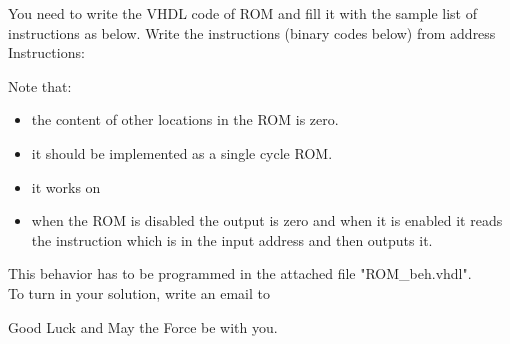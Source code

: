 \documentclass[a4paper,12pt]{article}
\begin{document}
You need to write the VHDL code of ROM and fill it with the sample list of instructions as below. Write the instructions (binary codes below) from address %
Instructions:
\begin{center}
\end{center}

Note that:

\begin{itemize}
\item the content of other locations in the ROM is zero.
\item it should be implemented as a single cycle ROM.
\item it works on %
\item when the ROM is disabled the output is zero and when it is enabled it reads the instruction which is in the input address and then outputs it. 
\end{itemize}

This behavior has to be programmed in the attached file "ROM\_beh.vhdl".\\

To turn in your solution, write an email to %

\vspace{0.7cm}

Good Luck and May the Force be with you.
\end{document}
